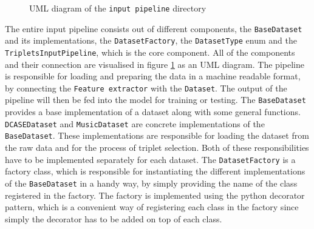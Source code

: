 \begin{figure}[ht]
{
    }
	\caption{UML diagram of the \texttt{input pipeline} directory}
	\label{fig:UML-Input-Pipeline}
\end{figure}
\noindent
The entire input pipeline consists out of different components, the \texttt{BaseDataset} and its implementations, the \texttt{DatasetFactory}, the \texttt{DatasetType} enum and the \texttt{TripletsInputPipeline}, which is the core component. All of the components and their connection are visualised in figure \ref{fig:UML-Input-Pipeline} as an UML diagram. The pipeline is responsible for loading and preparing the data in a machine readable format, by connecting the \texttt{Feature extractor} with the \texttt{Dataset}. The output of the pipeline will then be fed into the model for training or testing.
\newline
\newline
The \texttt{BaseDataset} provides a base implementation of a dataset along with some general functions. \texttt{DCASEDataset} and \texttt{MusicDataset} are concrete implementations of the \texttt{BaseDataset}. These implementations are responsible for loading the dataset from the raw data and for the process of triplet selection. Both of these responsibilities have to be implemented separately for each dataset. The \texttt{DatasetFactory} is a factory class, which is responsible for instantiating the different implementations of the \texttt{BaseDataset} in a handy way, by simply providing the name of the class registered in the factory. The factory is implemented using the python decorator pattern, which is a convenient way of registering each class in the factory since simply the decorator has to be added on top of each class.

